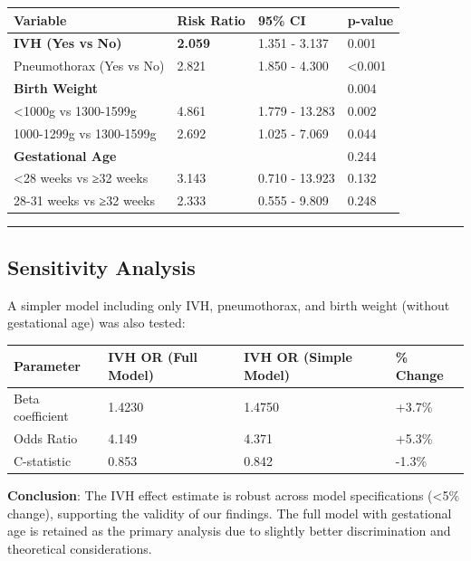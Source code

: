\documentclass[
]{article}
\begin{document}
\begin{longtable}[]{@{}llll@{}}
\toprule
Variable & Risk Ratio & 95\% CI & p-value \\
\midrule
\endhead
\textbf{IVH (Yes vs No)} & \textbf{2.059} & 1.351 - 3.137 & 0.001 \\
Pneumothorax (Yes vs No) & 2.821 & 1.850 - 4.300 & \textless0.001 \\
\textbf{Birth Weight} & & & 0.004 \\
\textless1000g vs 1300-1599g & 4.861 & 1.779 - 13.283 & 0.002 \\
1000-1299g vs 1300-1599g & 2.692 & 1.025 - 7.069 & 0.044 \\
\textbf{Gestational Age} & & & 0.244 \\
\textless28 weeks vs ≥32 weeks & 3.143 & 0.710 - 13.923 & 0.132 \\
28-31 weeks vs ≥32 weeks & 2.333 & 0.555 - 9.809 & 0.248 \\
\bottomrule
\end{longtable}

\begin{center}\rule{0.5\linewidth}{0.5pt}\end{center}

\hypertarget{sensitivity-analysis}{%
\subsection{Sensitivity Analysis}\label{sensitivity-analysis}}

A simpler model including only IVH, pneumothorax, and birth weight
(without gestational age) was also tested:

\begin{longtable}[]{@{}llll@{}}
\toprule
Parameter & IVH OR (Full Model) & IVH OR (Simple Model) & \% Change \\
\midrule
\endhead
Beta coefficient & 1.4230 & 1.4750 & +3.7\% \\
Odds Ratio & 4.149 & 4.371 & +5.3\% \\
C-statistic & 0.853 & 0.842 & -1.3\% \\
\bottomrule
\end{longtable}

\textbf{Conclusion}: The IVH effect estimate is robust across model
specifications (\textless5\% change), supporting the validity of our
findings. The full model with gestational age is retained as the primary
analysis due to slightly better discrimination and theoretical
considerations.
\end{document}

